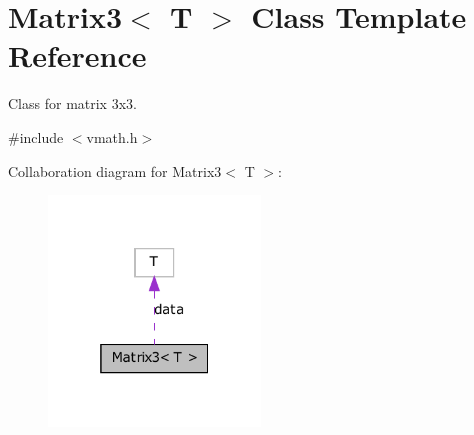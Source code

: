 \hypertarget{class_matrix3}{
\section{Matrix3$<$ T $>$ Class Template Reference}
\label{class_matrix3}
}


Class for matrix 3x3.  




{\ttfamily \#include $<$vmath.h$>$}



Collaboration diagram for Matrix3$<$ T $>$:\nopagebreak
\begin{figure}[H]
\begin{center}
\leavevmode
\includegraphics[width=160pt]{class_matrix3__coll__graph}
\end{center}
\end{figure}
